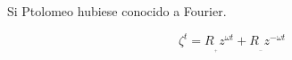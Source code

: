 \documentclass[preview]{standalone}
\begin{document}
\begin{center}
Si Ptolomeo  hubiese conocido a Fourier.

$$\zeta ^ t=  R_{_{_+}} z^{\omega t} +R_{_{_-}} z^{-\omega t}$$
\end{center}
\end{document}

